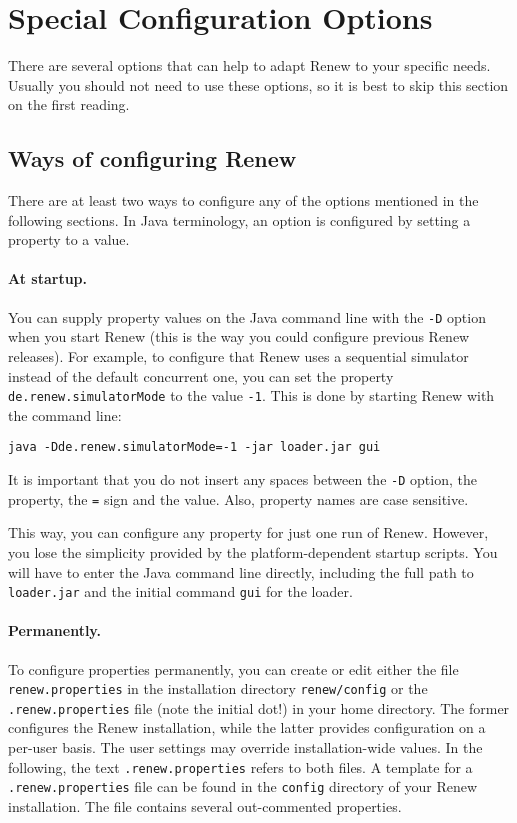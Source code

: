 \section{Special Configuration Options}
\label{subsec:options}

There are several options that can help to adapt Renew to
your specific needs. Usually you should not need
to use these options, so it is best to skip this
section on the first reading.


\subsection{Ways of configuring Renew}
\label{subsec:configMethods}

There are at least two ways to configure any of the
options mentioned in the following sections.
In Java terminology, an option is configured by setting a property
to a value.

\paragraph{At startup.}
You can supply property values on the Java command line with the \texttt{-D}
option when you start Renew (this is the way you could configure
previous Renew releases). 
For example, to configure that Renew uses a sequential simulator
instead of the default concurrent one, you can set the property
\texttt{de.renew.simulatorMode} to the value \texttt{-1}.
This is done by starting Renew with the command line:
\begin{lstlisting}[style=xnonfloating]
  java -Dde.renew.simulatorMode=-1 -jar loader.jar gui
\end{lstlisting}
It is important that you do not insert any spaces between the
\texttt{-D} option, the property, the \texttt{=} sign and the value.
Also, property names are case sensitive.

This way, you can configure any property for just one run of Renew. 
However, you lose the simplicity provided by the platform-dependent
startup scripts.
You will have to enter the Java command line directly, including the
full path to \texttt{loader.jar} and the initial command \texttt{gui}
for the loader.

\paragraph{Permanently.}
To configure properties permanently, you can create or edit either the file
\texttt{renew.properties} in the installation directory
\texttt{renew\renewversion/config} or the \texttt{.renew.properties} file (note the initial dot!) in your home
directory.
The former configures the Renew installation, while
the latter provides configuration on a per-user basis.
The user settings may override installation-wide values.
In the following, the text \texttt{.renew.properties} refers to both
files. A template for a \texttt{.renew.properties} file can be found
in the \texttt{config} directory of your Renew installation. The file
contains several out-commented properties. %


